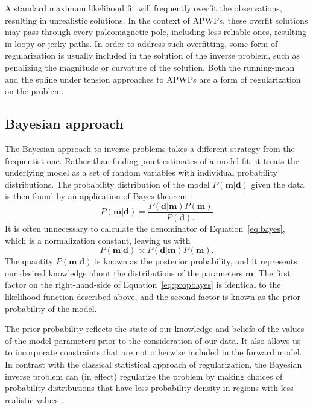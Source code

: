 \documentclass[11pt,letterpaper]{article}
\begin{document}
A standard maximum likelihood fit will frequently overfit the observations, resulting in unrealistic solutions. In the context of APWPs, these overfit solutions may pass through every paleomagnetic pole, including less reliable ones, resulting in loopy or jerky paths. In order to address such overfitting, some form of regularization is usually included in the solution of the inverse problem, such as penalizing the magnitude or curvature of the solution. Both the running-mean and the spline under tension approaches to APWPs are a form of regularization on the problem.

\subsection*{Bayesian approach}

The Bayesian approach to inverse problems takes a different strategy from the frequentist one. Rather than finding point estimates of a model fit, it treats the underlying model as a set of random variables with individual probability distributions. The probability distribution of the model $P(\mathbf{m} \vert \mathbf{d})$ given the data  is then found by an application of Bayes theorem \citep[cf.][]{Sivia2006a}:
\begin{equation}
P\left(\mathbf{m} \vert \mathbf{d} \right) = \frac{ P \left(\mathbf{d}\vert \mathbf{m} \right) P \left( \mathbf{m} \right) }{P \left( \mathbf{d}\right).}
\label{eq:bayes}
\end{equation}
It is often unnecessary to calculate the denominator of Equation~\eqref{eq:bayes}, which is a normalization constant, leaving us with
\begin{equation}
P\left(\mathbf{m} \vert \mathbf{d} \right) \propto P \left( \mathbf{d} \vert \mathbf{m} \right) P \left( \mathbf{m} \right).
\label{eq:propbayes}
\end{equation}
The quantity $P(\mathbf{m} \vert \mathbf{d})$ is known as the posterior probability, and it represents our desired knowledge about the distributions of the parameters $\mathbf{m}$. The first factor on the right-hand-side of Equation~\eqref{eq:propbayes} is identical to the likelihood function described above, and the second factor
is known as the prior probability of the model.

The prior probability reflects the state of our knowledge and beliefs of the values of the model parameters prior to the consideration of our data. It also allows us to incorporate constraints that are not otherwise included in the forward model. In contrast with the classical statistical approach of regularization, the Bayesian inverse problem can (in effect) regularize the problem by making
choices of probability distributions that have less probability density in regions with less realistic values \citep[e.g.][]{Minson2013a, Sambridge2013a}.
\end{document}
